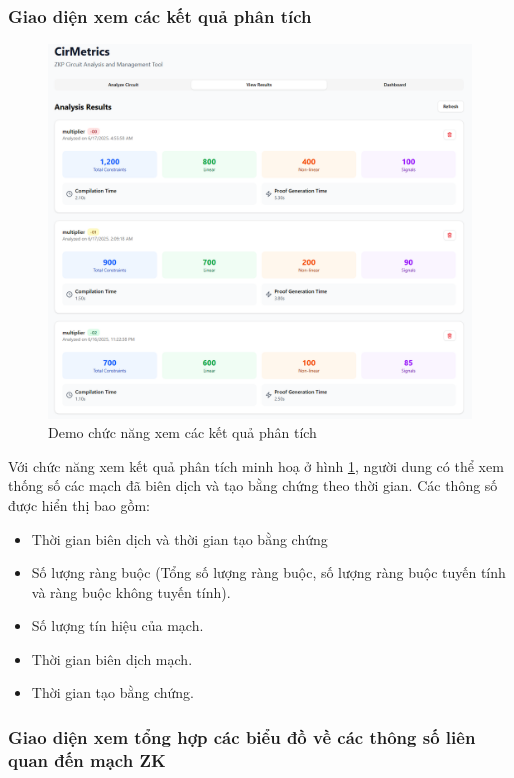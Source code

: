 \subsubsection{Giao diện xem các kết quả phân tích}
\begin{figure}[H]
    \centering
    \includegraphics[width=\textwidth]{imgs/resultscreen.png}
    \caption{Demo chức năng xem các kết quả phân tích}
    \label{fig:chapter6-resultscreen}
\end{figure}

Với chức năng xem kết quả phân tích minh hoạ ở hình \ref{fig:chapter6-resultscreen}, người dung có thể xem thống số các mạch đã biên dịch và tạo bằng chứng theo thời gian. Các thông số được hiển thị bao gồm:
\begin{itemize}
    \item Thời gian biên dịch và thời gian tạo bằng chứng
    \item Số lượng ràng buộc (Tổng số lượng ràng buộc, số lượng ràng buộc tuyến tính và ràng buộc không tuyến tính).
    \item Số lượng tín hiệu của mạch.
    \item Thời gian biên dịch mạch.
    \item Thời gian tạo bằng chứng.
\end{itemize}

\subsubsection{Giao diện xem tổng hợp các biểu đồ về các thông số liên quan đến mạch ZK}

